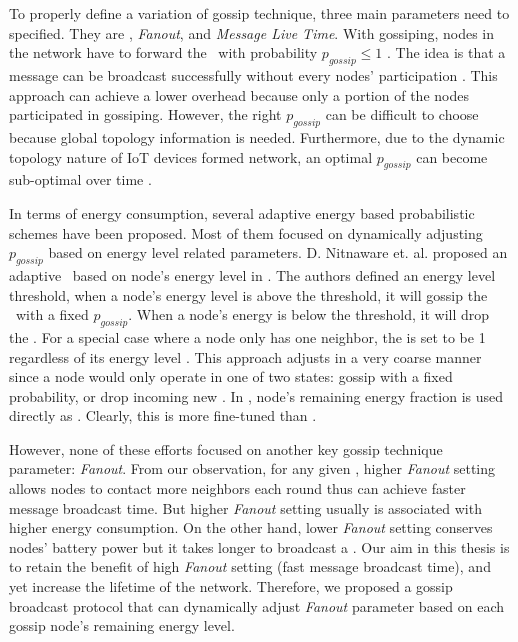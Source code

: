 To properly define a variation of gossip technique, three main parameters need to specified. They are \emph{\pog}, \emph{Fanout}, and \emph{Message Live Time}. With gossiping, nodes in the network have to forward the \msg ~with probability $p_{gossip} \leq 1$ \cite{smart}. The idea is that a message can be broadcast successfully without every nodes' participation \cite{smart}. This approach can achieve a lower overhead because only a portion of the nodes participated in gossiping. However, the right $p_{gossip}$ can be difficult to choose because global topology information is needed. Furthermore, due to the dynamic topology nature of IoT devices formed network, an optimal $p_{gossip}$ can become sub-optimal over time \cite{smart}. 

In terms of energy consumption, several adaptive energy based probabilistic schemes have been proposed. Most of them focused on dynamically adjusting $p_{gossip}$ based on energy level related parameters. D. Nitnaware et. al. proposed an adaptive \gp ~based on node's energy level in \cite{nitnaware2009performance}. The authors defined an energy level threshold, when a node's energy level is above the threshold, it will gossip the \msg ~with a fixed $p_{gossip}$. When a node's energy is below the threshold, it will drop the \msg. For a special case where a node only has one neighbor, the \emph{\pog} is set to be 1 regardless of its energy level \cite{2015survey}. This approach adjusts \emph{\pog} in a very coarse manner since a node would only operate in one of two states: gossip with a fixed probability, or drop incoming new \msgs. In \cite{nitnaware2010energy}, node's remaining energy fraction is used directly as \emph{\pog}. Clearly, this is more fine-tuned than \cite{nitnaware2009performance}.

However, none of these efforts focused on another key gossip technique parameter: \emph{Fanout}. From our observation, for any given \emph{\pog}, higher \emph{Fanout} setting allows nodes to contact more neighbors each round thus can achieve faster message broadcast time. But higher \emph{Fanout} setting usually is associated with higher energy consumption. On the other hand, lower \emph{Fanout} setting conserves nodes' battery power but it takes longer to broadcast a \msg. Our aim in this thesis is to retain the benefit of high \emph{Fanout} setting (fast message broadcast time), and yet increase the lifetime of the network. Therefore, we proposed a gossip broadcast protocol that can dynamically adjust \emph{Fanout} parameter based on each gossip node's remaining energy level.

